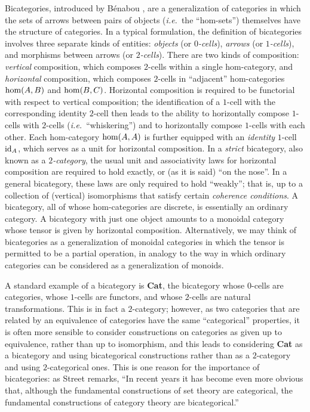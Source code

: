 \documentclass[11pt,notitlepage,a4paper]{report}
\begin{document}
Bicategories, introduced by B\'{e}nabou \cite{benabou}, are a generalization of categories
in which the sets of arrows between pairs of objects (\emph{i.e.}~the ``hom-sets'')
themselves have the structure of categories.  In a typical formulation, the definition of
bicategories involves three separate kinds of entities: \emph{objects} (or \emph{$0$-cells}),
\emph{arrows} (or \emph{$1$-cells}), and morphisms between arrows (or \emph{$2$-cells}).
There are two kinds of composition: \emph{vertical} composition, which composes $2$-cells
within a single hom-category, and \emph{horizontal} composition, which composes $2$-cells in
``adjacent'' hom-categories ${\rm hom}(A, B)$ and ${\rm hom}(B, C)$.
Horizontal composition is required to be functorial with respect to vertical composition;
the identification of a $1$-cell with the corresponding identity $2$-cell then leads to the
ability to horizontally compose $1$-cells with $2$-cells (\emph{i.e.}~``whiskering'')
and to horizontally compose $1$-cells with each other.
Each hom-category ${\rm hom}(A, A)$ is further equipped with an \emph{identity} $1$-cell
${\rm id}_A$, which serves as a unit for horizontal composition.
In a \emph{strict} bicategory, also known as a \emph{$2$-category}, the usual unit and
associativity laws for horizontal composition are required to hold exactly,
or (as it is said) ``on the nose''.
In a general bicategory, these laws are only required to hold ``weakly'';
that is, up to a collection of (vertical) isomorphisms that satisfy certain
\emph{coherence conditions}.
A bicategory, all of whose hom-categories are discrete, is essentially an ordinary category.
A bicategory with just one object amounts to a monoidal category whose tensor is given by
horizontal composition.
Alternatively, we may think of bicategories as a generalization of monoidal categories in
which the tensor is permitted to be a partial operation, in analogy to the way in which
ordinary categories can be considered as a generalization of monoids.

A standard example of a bicategory is \textbf{Cat}, the bicategory whose $0$-cells are
categories, whose $1$-cells are functors, and whose $2$-cells are natural transformations.
This is in fact a $2$-category; however, as two categories that are related by an equivalence
of categories have the same ``categorical'' properties, it is often more sensible to
consider constructions on categories as given up to equivalence, rather than up to
isomorphism, and this leads to considering \textbf{Cat} as a bicategory and using
bicategorical constructions rather than as a $2$-category and using $2$-categorical ones.
This is one reason for the importance of bicategories: as Street \cite{street-fibrations-ii} remarks,
``In recent years it has become even more obvious that, although the fundamental constructions
of set theory are categorical, the fundamental constructions of category theory are bicategorical.''
\end{document}
